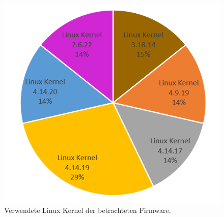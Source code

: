\documentclass[a4paper]{book}
\begin{document}
\begin{large}
\begin{onehalfspace}
\begin{figure}[ht]
\begin{center}
\includegraphics[scale=0.45]{images/linux_kernel} 
\caption{Verwendete Linux Kernel der betrachteten Firmware.}
\label{fig:Linux Kernel}
\end{center}
\end{figure}


\end{onehalfspace}
\end{large}
\end{document}
